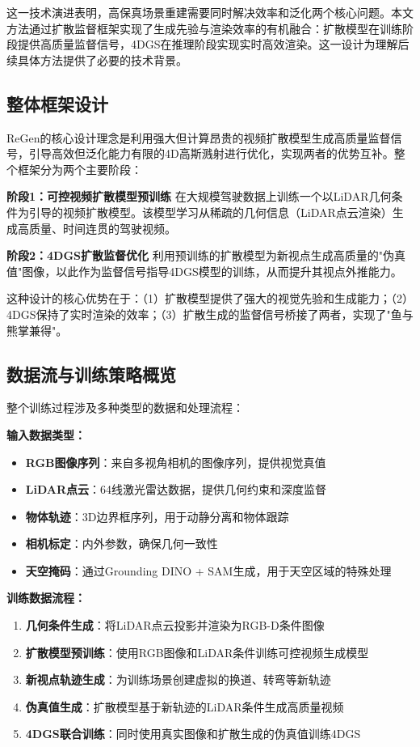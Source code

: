 这一技术演进表明，高保真场景重建需要同时解决效率和泛化两个核心问题。本文方法通过扩散监督框架实现了生成先验与渲染效率的有机融合：扩散模型在训练阶段提供高质量监督信号，4DGS在推理阶段实现实时高效渲染。这一设计为理解后续具体方法提供了必要的技术背景。

\subsection{整体框架设计}

ReGen的核心设计理念是利用强大但计算昂贵的视频扩散模型生成高质量监督信号，引导高效但泛化能力有限的4D高斯溅射进行优化，实现两者的优势互补。整个框架分为两个主要阶段：

\textbf{阶段1：可控视频扩散模型预训练}
在大规模驾驶数据上训练一个以LiDAR几何条件为引导的视频扩散模型。该模型学习从稀疏的几何信息（LiDAR点云渲染）生成高质量、时间连贯的驾驶视频。

\textbf{阶段2：4DGS扩散监督优化}
利用预训练的扩散模型为新视点生成高质量的"伪真值"图像，以此作为监督信号指导4DGS模型的训练，从而提升其视点外推能力。

这种设计的核心优势在于：（1）扩散模型提供了强大的视觉先验和生成能力；（2）4DGS保持了实时渲染的效率；（3）扩散生成的监督信号桥接了两者，实现了"鱼与熊掌兼得"。

\subsection{数据流与训练策略概览}

整个训练过程涉及多种类型的数据和处理流程：

\textbf{输入数据类型：}
\begin{itemize}
\item \textbf{RGB图像序列}：来自多视角相机的图像序列，提供视觉真值
\item \textbf{LiDAR点云}：64线激光雷达数据，提供几何约束和深度监督
\item \textbf{物体轨迹}：3D边界框序列，用于动静分离和物体跟踪
\item \textbf{相机标定}：内外参数，确保几何一致性
\item \textbf{天空掩码}：通过Grounding DINO + SAM生成，用于天空区域的特殊处理
\end{itemize}

\textbf{训练数据流程：}
\begin{enumerate}
\item \textbf{几何条件生成}：将LiDAR点云投影并渲染为RGB-D条件图像
\item \textbf{扩散模型预训练}：使用RGB图像和LiDAR条件训练可控视频生成模型
\item \textbf{新视点轨迹生成}：为训练场景创建虚拟的换道、转弯等新轨迹
\item \textbf{伪真值生成}：扩散模型基于新轨迹的LiDAR条件生成高质量视频
\item \textbf{4DGS联合训练}：同时使用真实图像和扩散生成的伪真值训练4DGS
\end{enumerate}

